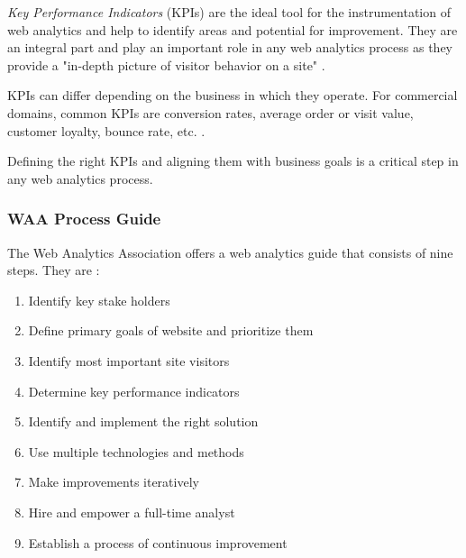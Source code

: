 
\textit{Key Performance Indicators} (KPIs) are the ideal tool for the instrumentation of web analytics and help to identify areas and potential for improvement.
They are an integral part and play an important role in any web analytics process as they provide a "in-depth picture of visitor behavior on a site" \cite{2009Jansen}. %

KPIs can differ depending on the business in which they operate.
For commercial domains, common KPIs are conversion rates, average order or visit value, customer loyalty, bounce rate, etc. \cite{2014Singal}.

Defining the right KPIs and aligning them with business goals is a critical step in any web analytics process.



\subsubsection{WAA Process Guide} %


The Web Analytics Association offers a web analytics guide that consists of nine steps. They are \cite{2009Jansen}: %

\begin{enumerate}
\item Identify key stake holders
\item Define primary goals of website and prioritize them
\item Identify most important site visitors
\item Determine key performance indicators
\item Identify and implement the right solution
\item Use multiple technologies and methods
\item Make improvements iteratively
\item Hire and empower a full-time analyst
\item Establish a process of continuous improvement
\end{enumerate}


